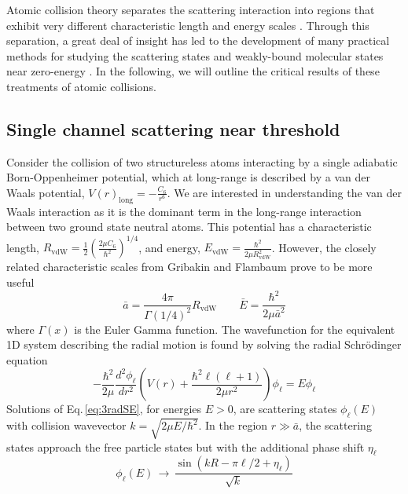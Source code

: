 Atomic collision theory separates the scattering interaction into regions that exhibit very different characteristic length and energy scales \cite{Julienne2009a}.
Through this separation, a great deal of insight has led to the development of many practical methods for studying the scattering states and weakly-bound molecular states near zero-energy \cite{wbz99,Gao01,gao04,Bohn1999,Julienne2009a,Vogels1998,Moerdijk1995,Julienne1989}.
In the following, we will outline the critical results of these treatments of atomic collisions.

\subsection{Single channel scattering near threshold} \label{ssec:low_energy}
Consider the collision of two structureless atoms interacting by a single adiabatic Born-Oppenheimer potential, which at long-range is described by a van der Waals potential, $V(r)_{\text{long}} = -\frac{C_6}{r^6}$.
We are interested in understanding the van der Waals interaction as it is the dominant term in the long-range interaction between two ground state neutral atoms.
This potential has a characteristic length, $R_{\mathrm{vdW}} = \frac{1}{2} \left(\frac{2 \mu C_6}{\hbar^2}\right)^{1/4}$, and energy, $E_\mathrm{vdW}=\frac{\hbar^2}{2\mu R_{\mathrm{vdW}}^2}$.
However, the closely related characteristic scales from Gribakin and Flambaum \cite{Boisseau2000a,gfl93} prove to be more useful 
\begin{equation}
	\bar{a} = \frac{4 \pi}{\Gamma(1/4)^2}R_{\mathrm{vdW}} \quad\quad \bar{E}=\frac{\hbar^2}{2\mu\bar{a}^2}
\end{equation}
where $\Gamma(x)$ is the Euler Gamma function.
The wavefunction for the equivalent 1D system describing the radial motion is found by solving the radial Schr\"{o}dinger equation
\begin{equation} \label{eq:3radSE}
	-\frac{\hbar^2}{2 \mu}\frac{d^2 \phi_{\ell}}{dr^2} \left( V(r) + \frac{\hbar^2\ell(\ell+1)}{2\mu r^2} \right) \phi_{\ell}=E\phi_{\ell}
\end{equation}
Solutions of Eq.\,\ref{eq:3radSE}, for energies $E>0$, are scattering states $\phi_{\ell}(E)$ with collision wavevector $k=\sqrt{2\mu E/\hbar^2}$.
In the region $r\gg\bar{a}$, the scattering states approach the free particle states but with the additional phase shift $\eta_\ell$
\begin{equation} \label{eq:3asymwf}
	\phi_{\ell}(E)\,\rightarrow\,\frac{\sin(kR-\pi\ell/2+\eta_{\ell})}{\sqrt{k}}
\end{equation}
